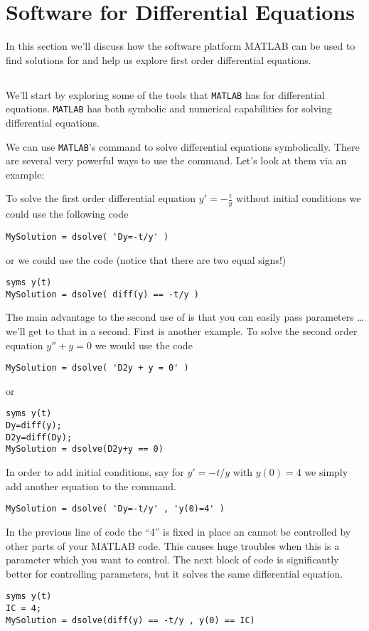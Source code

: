 \newpage\section{Software for Differential Equations}
In this section we'll discuss how the software platform MATLAB can be used to find
solutions for and help us explore first order differential equations.

\subsection{}
We'll start by exploring some of the tools that \texttt{MATLAB} has for differential
equations.  \texttt{MATLAB} has both symbolic and numerical capabilities for solving
differential equations.

We can use \texttt{MATLAB}'s  command to solve differential
        equations symbolically. There are several very powerful ways to use the
         command.  Let's look at them via an example:
        
        To solve the first order differential equation $y'=-\frac{t}{y}$ without initial
        conditions we could use the following code
\begin{lstlisting}
MySolution = dsolve( 'Dy=-t/y' )
\end{lstlisting}
        or we could use the code (notice that there are two equal signs!)
\begin{lstlisting}
syms y(t)
MySolution = dsolve( diff(y) == -t/y )
\end{lstlisting}
        The main advantage to the second use of  is that you  can easily
        pass parameters \dots we'll get to that in a second. First is another example.
        To solve the second order equation $y'' + y=0$ we would use the code
\begin{lstlisting}
MySolution = dsolve( 'D2y + y = 0' )
\end{lstlisting}
or
\begin{lstlisting}
syms y(t)
Dy=diff(y);
D2y=diff(Dy);
MySolution = dsolve(D2y+y == 0)
\end{lstlisting}


        In order to add initial conditions, say for $y'=-t/y$ with $y(0)=4$ we simply add
        another equation to the  command.
\begin{lstlisting}
MySolution = dsolve( 'Dy=-t/y' , 'y(0)=4' )
\end{lstlisting}
        In the previous line of code the ``4'' is fixed in place an cannot be controlled
        by other parts of your MATLAB code.  This causes huge troubles when this is a
        parameter which you want to control.  The next block of code is significantly
        better for controlling parameters, but it solves the same differential equation.
\begin{lstlisting}
syms y(t)
IC = 4;
MySolution = dsolve(diff(y) == -t/y , y(0) == IC)
\end{lstlisting}

